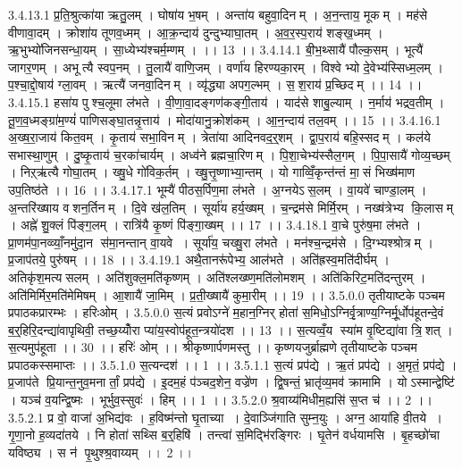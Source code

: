 3.4.13.1
प्र॒ति॒श्रुत्का॑या ऋतु॒लम् । घोषा॑य भ॒षम् । अन्ता॑य बहुवा॒दिनम् । अ॒न॒न्ताय॒ मूकम् । मह॑से वीणावा॒दम् । क्रोशा॑य तूणव॒ध्मम् । आ॒क्र॒न्दाय॑ दुन्दुभ्याघा॒तम् । अ॒व॒र॒स्प॒राय॑ शङ्ख॒ध्मम् । ऋ॒भुभ्यो॑जिनसन्धा॒यम् । सा॒ध्येभ्य॑श्चर्म॒म्णम् । ।। 13 ।।
3.4.14.1
बी॒भ॒थ्सायै॑ पौल्क॒सम् । भूत्यै॑ जागर॒णम् । अभूत्यै स्वप॒नम् । तु॒लायै॑ वाणि॒जम् । वर्णा॑य हिरण्यका॒रम् । विश्वेभ्यो दे॒वेभ्य॑स्सिध्म॒लम् । प॒श्चा॒द्दो॒षाय॑ ग्ला॒वम् । ऋत्यै॑ जनवा॒दिनम् । व्यृ॑द्ध्या अपग॒ल्भम् । स॒॒श॒राय॑ प्र॒च्छिदम् ।। 14 ।।
3.4.15.1
हसा॑य पुश्च॒लूमा ल॑भते । वी॒णा॒वा॒दङ्गण॑कङ्गी॒ताय॑ । याद॑से शाबु॒ल्याम् । न॒र्माय॑ भद्रव॒तीम् । तू॒ण॒व॒ध्मङ्ग्रा॑म॒ण्यं॑ पाणिसङ्घा॒तन्नृ॒त्ताय॑ । मोदा॑यानु॒क्रोश॑कम् । आ॒न॒न्दाय॑ तल॒वम् ।। 15 ।।
3.4.16.1
अ॒ख्ष॒रा॒जाय॑ कित॒वम् । कृ॒ताय॑ सभा॒विनम् । त्रेता॑या आदिनवद॒र्॒शम् । द्वा॒प॒राय॑ बहि॒स्सदम् । कल॑ये सभास्था॒णुम् । दु॒ष्कृ॒ताय॑ च॒रका॑चार्यम् । अध्व॑ने ब्रह्मचा॒रिणम् । पि॒शा॒चेभ्य॑स्सैल॒गम् । पि॒पा॒सायै॑ गोव्य॒च्छम् । निऱ्ऋ॑त्यै गोघा॒तम् । ख्षु॒धे गो॑विक॒र्तम् । ख्षु॒त्तृ॒ष्णाभ्या॒न्तम् । यो गाव्विँ॒कृन्त॑न्तं मा॒॒सं भिख्ष॑माण उप॒तिष्ठ॑ते ।। 16 ।।
3.4.17.1
भूम्यै॑ पीठस॒र्पिण॒मा ल॑भते । अ॒ग्नयेऽ॑स॒लम् । वा॒यवे॑ चाण्डा॒लम् । अ॒न्तरि॑ख्षाय वशन॒र्तिनम् । दि॒वे ख॑ल॒तिम् । सूर्या॑य हर्य॒ख्षम् । च॒न्द्रम॑से मिर्मि॒रम् । नख्ष॑त्रेभ्य कि॒लासम् । अह्ने॑ शु॒क्लं पि॑ङ्ग॒लम् । रात्रि॑यै कृ॒ष्णं पि॑ङ्गा॒ख्षम् ।। 17 ।।
3.4.18.1
वा॒चे पुरु॑ष॒मा ल॑भते । प्रा॒णम॑पा॒नव्व्याँ॒नमु॑दा॒न स॑मा॒नन्तान् वा॒यवे । सूर्या॑य॒ चख्षु॒रा ल॑भते । मन॑श्च॒न्द्रम॑से । दि॒ग्भ्यश्श्रोत्रम् । प्र॒जाप॑तये॒ पुरु॑षम् ।। 18 ।।
3.4.19.1
अथै॒तानरू॑पेभ्य॒ आल॑भते । अति॑ह्रस्व॒मति॑दीर्घम् । अतिकृ॑श॒मत्य॑सलम् । अति॑शुक्ल॒मति॑कृष्णम् । अति॑श्लख्ष्ण॒मति॑लोमशम् । अति॑किरिट॒मति॑दन्तुरम् । अति॑मिर्मिर॒मति॑मेमिषम् । आ॒शायै॑ जा॒मिम् । प्र॒ती॒ख्षायै॑ कुमा॒रीम् ।। 19 ।।
3.5.0.0
तृतीयाष्टके पञ्चम प्रपाठकप्रारम्भः । हरिःओम् ।
3.5.0.0
स॒त्यं प्रवोऽग्ने॑ म॒हान॒ग्निर् होता॑ स॒मिधो॒ऽग्निर्वृ॒त्राण्य॒ग्निर्मू॒र्धोप॑हूतन्दे॒वं ब॒र्॒हिरि॒दन्द्या॑वापृथिवी॒ तच्छ॒य्योँरा प्या॑य॒स्वोप॑हूत॒न्त्रयो॑दश ।। 13 ।। स॒त्यव्वँ॒य स्या॑म वृ॒ष्टिद्या॑वा त्रि॒॒शत् । स॒त्यमुप॑हूता ।। 30 ।। हरिः॑ ओम् ।। श्रीकृष्णार्पणमस्तु ।। कृष्णयजुर्ब्राह्मणे तृतीयाष्टके पञ्चम प्रपाठकस्समाप्तः ।।
3.5.1.0
स॒त्यन्दश॑ ।। 1 ।।
3.5.1.1
स॒त्यं प्रप॑द्ये । ऋ॒तं प्रप॑द्ये । अ॒मृतं॒ प्रप॑द्ये । प्र॒जाप॑ते प्रि॒यान्त॒नुव॒मनार्तां॒ प्रप॑द्ये । इ॒दम॒हं प॑ञ्चद॒शेन॒ वज्रे॑ण । द्वि॒षन्तं॒ भ्रातृ॑व्य॒मव॑ क्रामामि । योऽस्मान्द्वेष्टि॑ । यञ्च॑ व॒यन्द्वि॒ष्मः । भूर्भुव॒स्सुवः॑ । हिम् ।। 1 ।।
3.5.2.0
श्र॒वाय्य॑मिधीम॒ह्यसि॑ स॒प्त च॑ ।। 2 ।।
3.5.2.1
प्र वो॒ वाजा॑ अ॒भिद्य॑वः । ह॒विष्म॑न्तो घृ॒ताच्या । दे॒वाञ्जि॑गाति सुम्न॒युः । अग्न॒ आया॑हि वी॒तये । गृ॒णा॒नो ह॒व्यदा॑तये । नि होता॑ सथ्सि ब॒र्॒हिषि॑ । तन्त्वा॑ स॒मिद्भि॑रङ्गिरः । घृ॒तेन॑ वर्धयामसि । बृ॒हच्छो॑चा यविष्ठ्य । स न॑ पृ॒थुश्श्र॒वाय्यम् ।। 2 ।।
